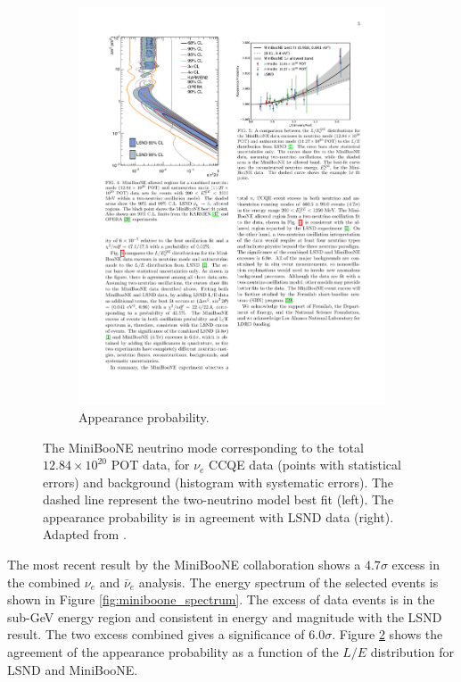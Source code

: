 \begin{figure}[htbp]
\begin{subfigure}{0.48\textwidth}
\begin{center}
    \includegraphics[width=\linewidth]{figures/miniboone_lsnd.pdf}
    \caption{Appearance probability.}
    \label{fig:miniboone_lsnd}
    \end{center}
  \end{subfigure}
  \caption{The MiniBooNE neutrino mode corresponding to the total $12.84\times10^{20}$ POT data, for $\nu_e$ CCQE data (points with statistical errors) and background (histogram with systematic errors). The dashed line represent the two-neutrino model best fit (left). The appearance probability is in agreement with LSND data (right). Adapted from \cite{Aguilar-Arevalo:2018gpe}.}
\end{figure}


The most recent result by the MiniBooNE collaboration \cite{Aguilar-Arevalo:2018gpe} shows a $4.7\sigma$ excess in the combined $\nu_{e}$ and $\bar{\nu}_{e}$ analysis. The energy spectrum of the selected events is shown in Figure \ref{fig:miniboone_spectrum}. The excess of data events is in the sub-GeV energy region and consistent in energy and magnitude with the LSND result. The two excess combined gives a significance of $6.0\sigma$. Figure \ref{fig:miniboone_lsnd} shows the agreement of the appearance probability as a function of the $L/E$ distribution for LSND and MiniBooNE. 

